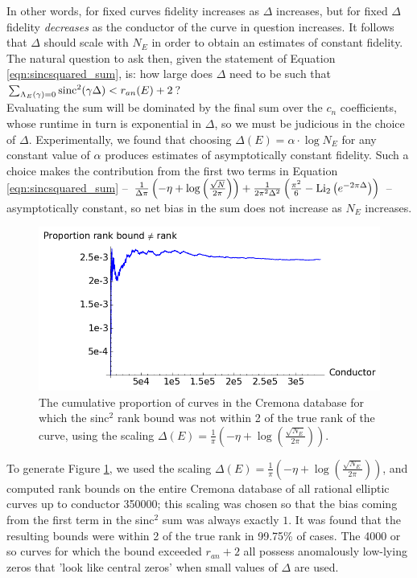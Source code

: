In other words, for fixed curves fidelity increases as $\Delta$ increases, but for fixed $\Delta$ fidelity {\it decreases} as the conductor of the curve in question increases. It follows that $\Delta$ should scale with $N_E$ in order to obtain an estimates of constant fidelity. The natural question to ask then, given the statement of Equation \ref{eqn:sincsquared_sum}, is: how large does $\Delta$ need to be such that $\sum_{\Lambda_E(\gamma)=0}\text{sinc}^2(\gamma \Delta) < r_{an}(E)+2$? \\

Evaluating the sum will be dominated by the final sum over the $c_n$ coefficients, whose runtime in turn is exponential in $\Delta$, so we must be judicious in the choice of $\Delta$. Experimentally, we found that choosing $\Delta(E) = \alpha \cdot \log N_E$ for any constant value of $\alpha$ produces estimates of asymptotically constant fidelity. Such a choice makes the contribution from the first two terms in Equation \ref{eqn:sincsquared_sum} -- $\frac{1}{\Delta \pi}\left(-\eta + \log\left(\frac{\sqrt{N}}{2\pi}\right)\right) + \frac{1}{2\pi^2 \Delta^2}\left(\frac{\pi^2}{6} - \text{Li}_2\left(e^{-2\pi \Delta}\right)\right)$ -- asymptotically constant, so net bias in the sum does not increase as $N_E$ increases. \\

\begin{figure}[!h]
    \centering
    \includegraphics[width=1.0\textwidth]{graphics/rkub_ne_rk.png}
    \caption{The cumulative proportion of curves in the Cremona database for which the sinc$^2$ rank bound was not within 2 of the true rank of the curve, using the scaling $\Delta(E) = \frac{1}{\pi}\left(-\eta + \log\left(\frac{\sqrt{N_E}}{2\pi}\right)\right)$. }
    \label{fig:rkub_ne_rk}
\end{figure}

To generate Figure \ref{fig:rkub_ne_rk}, we used the scaling $\Delta(E) = \frac{1}{\pi}\left(-\eta + \log\left(\frac{\sqrt{N_E}}{2\pi}\right)\right)$, and computed rank bounds on the entire Cremona database of all rational elliptic curves up to conductor 350000; this scaling was chosen so that the bias coming from the first term in the sinc$^2$ sum was always exactly $1$. It was found that the resulting bounds were within 2 of the true rank in 99.75\% of cases. The 4000 or so curves for which the bound exceeded $r_{an}+2$ all possess anomalously low-lying zeros that 'look like central zeros' when small values of $\Delta$ are used. \\

